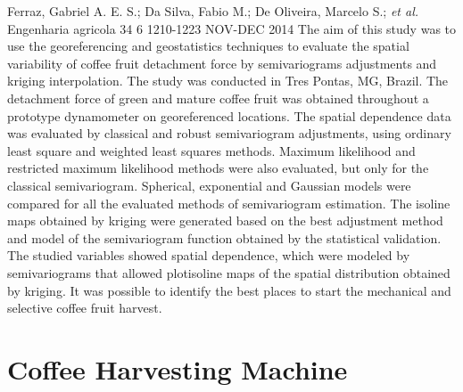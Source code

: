 {Ferraz, Gabriel A. E. S.; Da Silva, Fabio M.; De Oliveira, Marcelo S.;
  \textit{et al.}}%
{Engenharia agricola}%
{34}%
{6}%
{1210-1223}%
{NOV-DEC 2014}%
{The aim of this study was to use the georeferencing and geostatistics
  techniques to evaluate the spatial variability of coffee fruit detachment
  force by semivariograms adjustments and kriging interpolation. The study was
  conducted in Tres Pontas, MG, Brazil. The detachment force of green and mature
  coffee fruit was obtained throughout a prototype dynamometer on georeferenced
  locations. The spatial dependence data was evaluated by classical and robust
  semivariogram adjustments, using ordinary least square and weighted least
  squares methods. Maximum likelihood and restricted maximum likelihood methods
  were also evaluated, but only for the classical semivariogram. Spherical,
  exponential and Gaussian models were compared for all the evaluated methods of
  semivariogram estimation. The isoline maps obtained by kriging were generated
  based on the best adjustment method and model of the semivariogram function
  obtained by the statistical validation. The studied variables showed spatial
  dependence, which were modeled by semivariograms that allowed plotisoline maps
  of the spatial distribution obtained by kriging. It was possible to identify
  the best places to start the mechanical and selective coffee fruit
  harvest.}%


\section{Coffee Harvesting Machine}
\label{sec:coff-harv-mach}

